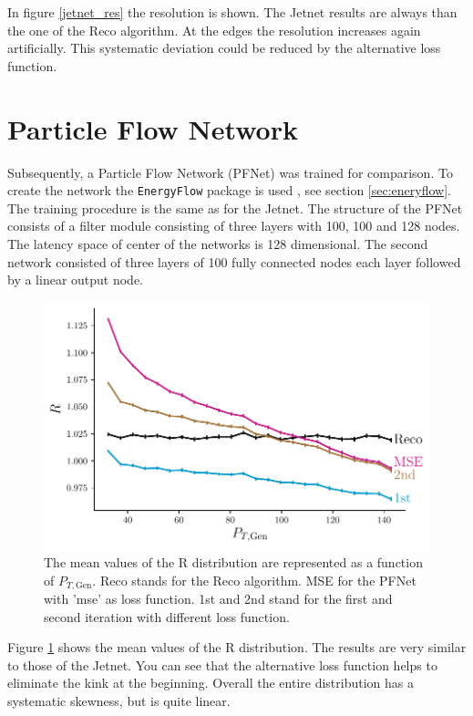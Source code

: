 \documentclass[12pt, a4paper]{thesis}
\begin{document}
In figure \ref{jetnet_res} the resolution is shown. The Jetnet results
are always than the one of the Reco algorithm. At the edges the
resolution increases again artificially. This systematic deviation
could be reduced by the alternative loss function.

\section{Particle Flow Network}
\label{sec:org307355e}

Subsequently, a Particle Flow Network (PFNet) was trained for
comparison. To create the network the \texttt{EnergyFlow} package is
used \cite{komiske19_energ_flow_networ}, see section
\ref{sec:eneryflow}. The training procedure is the same as for the
Jetnet. The structure of the PFNet consists of a filter module
consisting of three layers with 100, 100 and 128 nodes. The latency
space of center of the networks is 128 dimensional. The second network
consisted of three layers of 100 fully connected nodes each layer
followed by a linear output node.

\begin{figure}[H]
  \centering
  \includegraphics[width=.9\linewidth]{../images/pfnet_R.pdf}
  \caption{The mean values of the R distribution are represented as a
    function of \(P_{T, \text{Gen}}\). Reco stands for the Reco
    algorithm. MSE for the PFNet with 'mse' as loss function. 1st and
    2nd stand for the first and second iteration with different loss
    function.}
  \label{pfnet_R}
\end{figure}

Figure \ref{pfnet_R} shows the mean values of the R
distribution. The results are very similar to those of the Jetnet. You
can see that the alternative loss function helps to eliminate the kink
at the beginning.  Overall the entire distribution has a systematic
skewness, but is quite linear.
\end{document}
